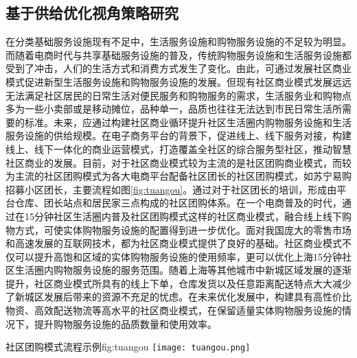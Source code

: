\documentclass{shnuthesis}
\begin{document}
\subsection{基于供给优化视角策略研究}

在分类基础服务设施现有不足中，生活服务设施和购物服务设施的不足较为明显。而随着电商时代与共享基础服务设施的普及，传统购物服务设施和生活服务设施都受到了冲击，人们的生活方式和消费方式发生了变化。由此，可通过发展社区商业模式促进新型生活服务设施和购物服务设施的发展。但现有社区商业模式发展远远无法满足社区居民的日常生活对便民服务和购物服务的需求，生活服务业和购物点多为一些小卖部或是移动摊位，品种单一，品质也往往无法达到市民日常生活所需要的标准。未来，应通过构建社区商业循环提升社区生活圈内购物服务设施和生活服务设施的供给规模\textsuperscript{\cite{dong2017}}。在电子商务平台的背景下，促进线上、线下服务对接，构建线上、线下一体化的商业运营模式，打造覆盖全社区的综合服务型社区，推动智慧社区商业的发展\textsuperscript{\cite{zhu2018a}}。目前，对于社区商业模式较为主流的是社区团购商业模式，而较为主流的社区团购模式为各大电商平台配备社区团长的社区团购模式，如苏宁易购招募小区团长，主要流程如图\ref{fig:tuangou}。通过对于社区团长的培训，形成由平台仓库、团长站点和居民家三点构成的社区团购体系。在一个电商普及的时代，通过在15分钟社区生活圈内普及社区团购模式这样的社区商业模式，融合线上线下购物方式，可使实体购物服务设施的配置得到进一步优化。面对我国庞大的零售市场和高速发展的互联网技术，都为社区商业模式提供了良好的基础。社区商业模式不仅可以提升高饱和区域的实体购物服务设施的使用频率，更可以优化上海15分钟社区生活圈内购物服务设施的服务范围。随着上海等其他城市中新城区域发展的逐渐提升，社区商业模式所具有的线上下单，仓库发货以及任意距离配送特点大大减少了新城区发展后带来的资源不充足的忧虑。在未来优化发展中，构建具有高性价比物资、高效配送物流等高水平的社区商业模式，在保留适量实体购物服务设施的情况下，提升购物服务设施的品质数量和使用效率。

\begin{generalfig}[htb]{社区团购模式流程示例}{fig:tuangou}
	\vspace{1em}
	\texttt{[image: tuangou.png]}
	\setlength{\belowcaptionskip}{1em}   %
\end{generalfig}
\end{document}

